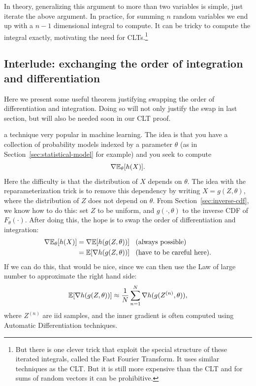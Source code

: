 \documentclass{article}
\begin{document}
 In theory, generalizing this argument to more than two variables is simple, just iterate the above argument. In practice, for summing $n$ random variables we end up with a $n-1$ dimensional integral to compute. It can be tricky to compute the integral exactly, motivating the need for CLTs.\footnote{But there is one clever trick that exploit the special structure of these iterated integrals, called the Fast Fourier Transform. It uses similar techniques as the CLT. But it is still more expensive than the CLT and for sums of random vectors it can be prohibitive.}


\subsection{Interlude: exchanging the order of integration and differentiation}\label{sec:exchange}

Here we present some useful theorem justifying swapping the order of differentiation and integration. Doing so will not only justify the swap in last section, but will also be needed soon in our CLT proof. 

 a technique very popular in machine learning. The idea is that you have a collection of probability models indexed by a parameter $\theta$ (as in Section~\ref{sec:statistical-model} for example) and you seek to compute
\[ \nabla {\mathbb E}_\theta [h(X)]. \] 
Here the difficulty is that the distribution of $X$ depends on $\theta$. The idea with the reparameterization trick is to remove this dependency by writing $X = g(Z, \theta)$, where the distribution of $Z$ does not depend on $\theta$. From Section~\ref{sec:inverse-cdf}, we know how to do this: set $Z$ to be uniform, and $g(\cdot, \theta)$ to the inverse CDF of $F_\theta(\cdot)$. After doing this, the hope is to swap the order of differentiation and integration:
\begin{align*}
\nabla {\mathbb E}_\theta [h(X)] &= \nabla {\mathbb E} [h(g(Z,\theta))] \;\;\text{ (always possible)} \\
&=  {\mathbb E} [\nabla h(g(Z,\theta))] \;\;\text{ (have to be careful here).}
\end{align*}
If we can do this, that would be nice, since we can then use the Law of large number to approximate the right hand side:
\[ {\mathbb E} [\nabla h(g(Z,\theta))] \approx \frac{1}{N} \sum_{n=1}^N \nabla h(g(Z^{(n)},\theta)),  \]
where $Z^{(n)}$ are iid samples, and the inner gradient is often computed using Automatic Differentiation techniques.
\end{document}
